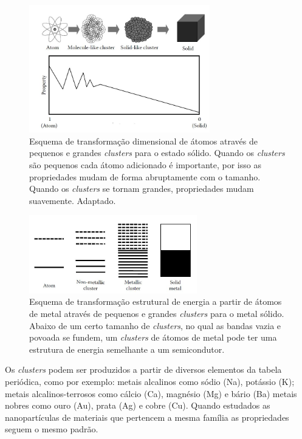 \begin{figure}
  \centering
  \includegraphics[width=0.7\textwidth]{images/clusters/atomo_cluste_solido}
  \caption{Esquema de transformação dimensional de átomos através de pequenos e grandes \textit{clusters} para o estado sólido. Quando os \textit{clusters} são pequenos cada átomo adicionado é importante, por isso as propriedades mudam
de forma abruptamente com o tamanho. Quando os \textit{clusters} se tornam grandes,
propriedades mudam suavemente\cite{cap06_Nanophysics}. Adaptado.  }
  \label{fig:transicao_cluster_solido}
\end{figure}




\begin{figure}
  \centering
  \includegraphics[width=0.65\textwidth]{images/clusters/carac_metal}
  \caption{ Esquema de transformação estrutural de energia a partir de átomos de metal através de pequenos e grandes \textit{clusters} para o metal sólido. Abaixo de um certo tamanho de \textit{clusters}, no qual as bandas vazia e povoada se fundem, um \textit{clusters} de átomos de metal pode ter uma estrutura de energia semelhante a um semicondutor.\cite{dissertacao_anderson}  }
  \label{fig:carac_metal}
\end{figure}

Os \textit{clusters} podem ser produzidos a partir de diversos elementos da tabela periódica, como por exemplo: metais alcalinos como sódio (Na), potássio (K); metais alcalinos-terrosos como cálcio (Ca), magnésio (Mg) e bário (Ba) metais nobres como ouro (Au), prata (Ag) e cobre (Cu). Quando estudados as nanopartículas de materiais que pertencem a mesma família as propriedades seguem o mesmo padrão.


